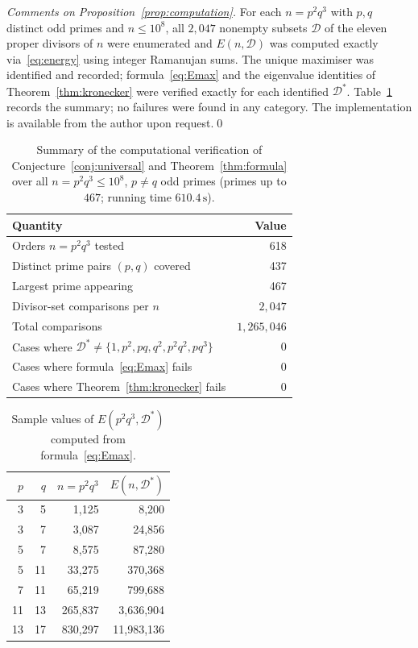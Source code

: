 \documentclass[12pt,a4paper]{article}
\theoremstyle{plain}
\theoremstyle{definition}
\newcommand{\Dstar}{\mathcal{D}^*}
\begin{document}
\begin{proof}[Comments on Proposition~\ref{prop:computation}]
For each $n=p^2q^3$ with $p,q$ distinct odd primes and $n\le10^8$, all
$2{,}047$ nonempty subsets $\mathcal{D}$ of the eleven proper divisors
of $n$ were enumerated and $E(n,\mathcal{D})$ was computed exactly
via~\eqref{eq:energy} using integer Ramanujan sums.  The unique maximiser
was identified and recorded; formula~\eqref{eq:Emax} and the eigenvalue
identities of Theorem~\ref{thm:kronecker} were verified exactly for each
identified $\Dstar$.  Table~\ref{tab:computation} records the summary;
no failures were found in any category.  The implementation is available
from the author upon request.\qed
\end{proof}

\begin{table}[h]
\centering
\caption{Summary of the computational verification of
  Conjecture~\ref{conj:universal} and Theorem~\ref{thm:formula}
  over all $n=p^2q^3\le10^8$, $p\ne q$ odd primes
  (primes up to $467$; running time $610.4\,\mathrm{s}$).}
\label{tab:computation}
\begin{tabular}{lr}
\toprule
Quantity & Value \\
\midrule
Orders $n=p^2q^3$ tested & 618 \\
Distinct prime pairs $(p,q)$ covered & 437 \\
Largest prime appearing & 467 \\
Divisor-set comparisons per $n$ & $2{,}047$ \\
Total comparisons & $1{,}265{,}046$ \\
Cases where $\Dstar\ne\{1,p^2,pq,q^2,p^2q^2,pq^3\}$ & 0 \\
Cases where formula~\eqref{eq:Emax} fails & 0 \\
Cases where Theorem~\ref{thm:kronecker} fails & 0 \\
\bottomrule
\end{tabular}
\end{table}

\begin{table}[h]
\centering
\caption{Sample values of $E(p^2q^3,\Dstar)$ computed from
  formula~\eqref{eq:Emax}.}
\label{tab:sample}
\begin{tabular}{rrrr}
\toprule
$p$ & $q$ & $n=p^2q^3$ & $E(n,\Dstar)$ \\
\midrule
3  & 5  &        1{,}125 &        8{,}200 \\
3  & 7  &        3{,}087 &       24{,}856 \\
5  & 7  &        8{,}575 &       87{,}280 \\
5  & 11 &       33{,}275 &      370{,}368 \\
7  & 11 &       65{,}219 &      799{,}688 \\
11 & 13 &      265{,}837 &   3{,}636{,}904 \\
13 & 17 &      830{,}297 &  11{,}983{,}136 \\
\bottomrule
\end{tabular}
\end{table}
\end{document}
